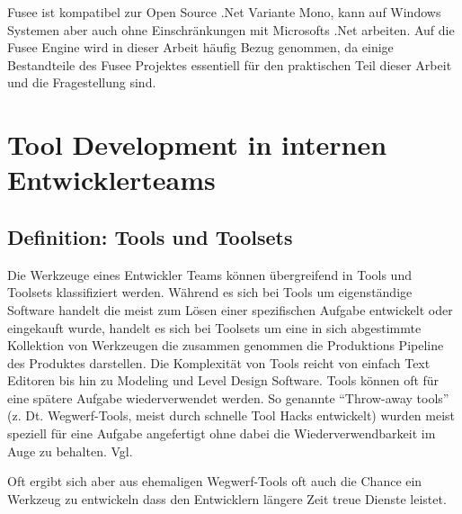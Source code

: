 \documentclass[pagesize, paper=a4, fontsize=12pt, titlepage=true, headings=small, headnosepline, abstractoff, liststotoc, nochapterprefix, plainheadsepline, twoside]{scrreprt}
\begin{document}
Fusee ist kompatibel zur Open Source .Net Variante Mono, kann auf Windows Systemen aber auch ohne Einschränkungen mit Microsofts .Net arbeiten. Auf die Fusee Engine wird in dieser Arbeit häufig Bezug genommen, da einige Bestandteile des Fusee Projektes essentiell für den praktischen Teil dieser Arbeit und die Fragestellung sind.



\chapter{Tool Development in internen Entwicklerteams}

\section{Definition: Tools und Toolsets}
Die Werkzeuge eines Entwickler Teams können übergreifend in Tools und Toolsets klassifiziert werden. Während es sich bei Tools um eigenständige Software handelt die meist zum Lösen einer spezifischen Aufgabe entwickelt oder eingekauft wurde, handelt es sich bei Toolsets um eine in sich abgestimmte Kollektion von Werkzeugen die zusammen genommen die Produktions Pipeline des Produktes darstellen. Die Komplexität von Tools reicht von einfach Text Editoren bis hin zu Modeling und Level Design Software.
Tools können oft für eine spätere Aufgabe wiederverwendet werden. So genannte “Throw-away tools” (z. Dt. Wegwerf-Tools, meist durch schnelle Tool Hacks entwickelt) wurden meist speziell für eine Aufgabe angefertigt ohne dabei die Wiederverwendbarkeit im Auge zu behalten. Vgl. \autocite[S. 3]{Wihlidal2006}

Oft ergibt sich aber aus ehemaligen Wegwerf-Tools oft auch die Chance ein Werkzeug zu entwickeln dass den Entwicklern längere Zeit treue Dienste leistet.
\end{document}
